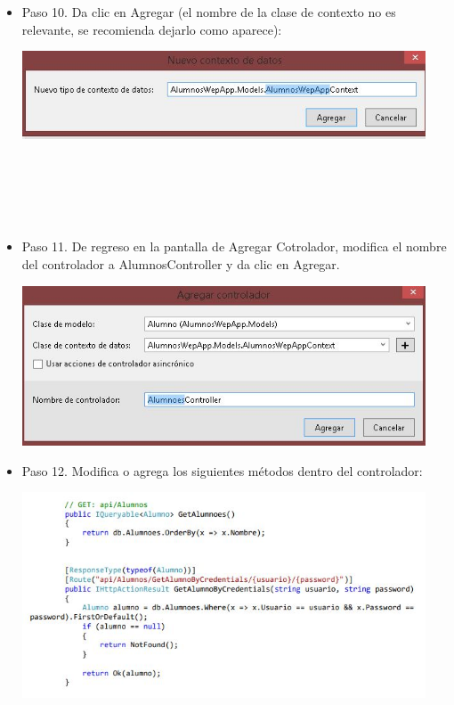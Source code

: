 \begin{flushleft}
\begin{itemize}
\item Paso 10. Da clic en Agregar (el nombre de la clase de contexto no es relevante, se recomienda dejarlo
como aparece): 
\begin{center}
	\includegraphics[width=12cm]{./Imagenes/paso10} 
	\end{center}

\textbf{ }\\
\textbf{ }\\
\textbf{ }\\
\textbf{ }\\
\item Paso 11. De regreso en la pantalla de Agregar Cotrolador, modifica el nombre del controlador a
AlumnosController y da clic en Agregar.
\begin{center}
	\includegraphics[width=12cm]{./Imagenes/paso11} 
	\end{center}

\item Paso 12. Modifica o agrega los siguientes métodos dentro del controlador:
\begin{center}
	\includegraphics[width=12cm]{./Imagenes/paso12} 
	\end{center}


\end{itemize}
\end{flushleft}
